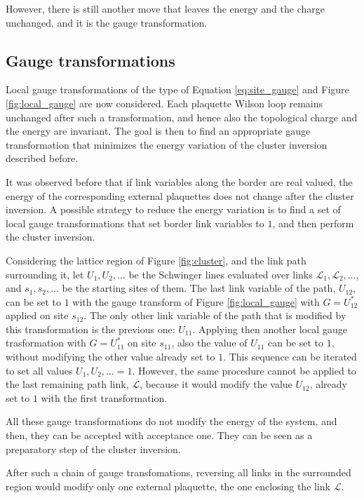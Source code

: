 However, there is still another move that leaves the energy and the charge unchanged,
and it is the gauge transformation.

\subsection*{Gauge transformations}
Local gauge transformations of the type of Equation \eqref{eq:site_gauge} and Figure \ref{fig:local_gauge} are now considered.
Each plaquette Wilson loop remains unchanged after such a transformation,
and hence also the topological charge and the energy are invariant.
The goal is then to find an appropriate gauge transformation that minimizes the energy variation of the cluster inversion described before.

It was observed before that if link variables along the border are real valued,
the energy of the corresponding external plaquettes does not change after the cluster inversion.
A possible strategy to reduce the energy variation is to find a set of local gauge transformations that set border link variables to $1$,
and then perform the cluster inversion.

Considering the lattice region of Figure \ref{fig:cluster}, and the link path surrounding it,
let $U_1, U_2, \ldots$ be the Schwinger lines evaluated over links $\mathcal L_1, \mathcal L_2, \ldots$,
and $s_1, s_2, \ldots$ be the starting sites of them.
The last link variable of the path, $U_{12}$, can be set to $1$ with the gauge transform of Figure \ref{fig:local_gauge}
with $G=U^*_{12}$ applied on site $s_{12}$.
The only other link variable of the path that is modified by this transformation is the previous one: $U_{11}$.
Applying then another local gauge trasformation with $G=U^*_{11}$ on site $s_{11}$,
also the value of $U_{11}$ can be set to $1$, without modifying the other value already set to $1$.
This sequence can be iterated to set all values $U_1,U_2,\ldots=1$.
However, the same procedure cannot be applied to the last remaining path link, $\mathcal L$,
because it would modify the value $U_{12}$, already set to $1$ with the first transformation.

All these gauge transformations do not modify the energy of the system,
and then, they can be accepted with acceptance one.
They can be seen as a preparatory step of the cluster inversion.

After such a chain of gauge transfomations,
reversing all links in the surrounded region would modify only one external plaquette,
the one enclosing the link $\mathcal L$.

